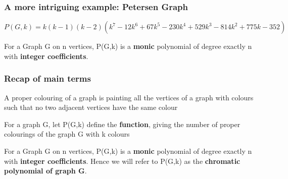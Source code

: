 \documentclass{beamer}
\begin{document}
\begin{frame}
\frametitle{A more intriguing example: Petersen Graph}
\begin{center}


\(P(G,k) = k(k-1)(k-2)(k^7-12k^6+67k^5-230k^4+529k^3-814k^2+775k-352)\)

\begin{theorem}
For a Graph G on n vertices, P(G,k) is a \textbf{monic} polynomial of degree exactly n with \textbf{integer coefficients}.
\end{theorem}

\end{center}
\end{frame}


\begin{frame}
\frametitle{Recap of main terms}
\begin{definition}
A proper colouring of a graph is painting all the vertices of a graph with colours such that no two adjacent vertices have the same colour
\end{definition}
\begin{definition}[P(G,k)]
For a graph G, let P(G,k) define the \textbf{function}, giving the number of proper colourings of the graph G with k colours
\end{definition}
\begin{theorem}
For a Graph G on n vertices, P(G,k) is a \textbf{monic} polynomial of degree exactly n with \textbf{integer coefficients}. Hence we will refer to P(G,k) as the \textbf{chromatic polynomial of graph G}.
\end{theorem}

\end{frame}
\end{document}
